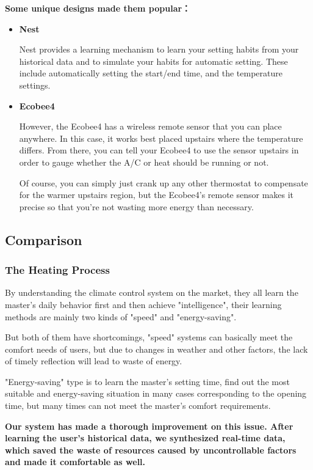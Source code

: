 \documentclass{mcmthesis}
\begin{document}
			\textbf{Some unique designs made them popular：}
			
			\begin{itemize}
				\item \textbf{Nest}
				
				Nest provides a learning mechanism to learn your setting habits from your historical data and to simulate your habits for automatic setting. 
				These include automatically setting the start/end time, and the  temperature settings.
				
				\item \textbf{Ecobee4}
				
				However, the Ecobee4 has a wireless remote sensor that you can place anywhere. In this case, it works best placed upstairs where the temperature differs. From there, you can tell your Ecobee4 to use the sensor upstairs in order to gauge whether the A/C or heat should be running or not.
				
				Of course, you can simply just crank up any other thermostat to compensate for the warmer upstairs region, but the Ecobee4’s remote sensor makes it precise so that you’re not wasting more energy than necessary.
				
			\end{itemize}
		
		
		\subsection{Comparison}
			\subsubsection{The Heating Process}
				By understanding the climate control system on the market, they all learn the master's daily behavior first and then achieve "intelligence", their learning methods are mainly two kinds of "speed" and "energy-saving".
				
				But both of them have shortcomings, "speed" systems can basically meet the comfort needs of users, but due to changes in weather and other factors, the lack of timely reflection will lead to waste of energy.
				
				"Energy-saving" type is to learn the master's setting time, find out the most suitable and energy-saving situation in many cases corresponding to the opening time, but many times can not meet the master's comfort requirements.
				
				\textbf{Our system has made a thorough improvement on this issue. After learning the user's historical data, we synthesized real-time data, which saved the waste of resources caused by uncontrollable factors and made it comfortable as well.}
				
\end{document}
